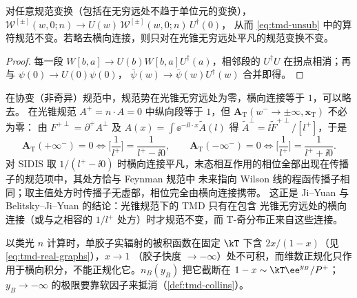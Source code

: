 \begin{proposition}[规范不变性]\tagR
\label{prop:tmd-gauge}
对任意规范变换（包括在无穷远处不趋于单位元的变换），$\mathcal W^{[\pm]}(w,0;n)\to U(w)\,\mathcal W^{[\pm]}(w,0;n)\,U^\dagger(0)$，
从而 \eqref{eq:tmd-unsub} 中的算符规范不变。若略去横向连接，则只对在光锥无穷远处平凡的规范变换不变。
\end{proposition}
\begin{proof}
每一段 $W[b,a]\to U(b)W[b,a]U^\dagger(a)$，相邻段的 $U^\dagger U$ 在拐点相消；再与 $\psi(0)\to U(0)\psi(0)$，
$\bar\psi(w)\to\bar\psi(w)U^\dagger(w)$ 合并即得。
\end{proof}

\begin{remark}
\label{rem:transverse-link}
在协变（非奇异）规范中，规范势在光锥无穷远处为零，横向连接等于 $1$，可以略去\cite{AybatRogers2011}。
在光锥规范 $A^+=n\cdot A=0$ 中纵向段等于 $1$，但 $\boldsymbol A_{\mathrm T}(w^-\to\pm\infty,\boldsymbol x_{\mathrm T})$ 不必为零：
由 $F^{+\perp}=\partial^+A^\perp$ 及 $A(x)=\int\ee^{-\ii l\cdot x}\tilde A(l)$ 得 $\tilde A^\perp=\ii\tilde F^{+\perp}/[l^+]$，于是
\begin{equation}
  \boldsymbol A_{\mathrm T}(+\infty^-)=0\iff\Big[\frac1{l^+}\Big]=\frac1{l^+-\ii0},\qquad
  \boldsymbol A_{\mathrm T}(-\infty^-)=0\iff\Big[\frac1{l^+}\Big]=\frac1{l^++\ii0}.
  \label{eq:lc-prescription}
\end{equation}
对 SIDIS 取 $1/(l^+-\ii0)$ 时横向连接平凡，末态相互作用的相位全部出现在传播子的规范项中，其处方恰与 Feynman 规范中
未来指向 Wilson 线的程函传播子相同；取主值处方时传播子无虚部，相位完全由横向连接携带。
这正是 Ji--Yuan\cite{JiYuan2002} 与 Belitsky--Ji--Yuan\cite{BelitskyJiYuan2003} 的结论：光锥规范下的 TMD 只有在包含
光锥无穷远处的横向连接（或与之相容的 $1/l^+$ 处方）时才规范不变，而 T-奇分布正来自这些连接。
\end{remark}

\begin{remark}[快度发散]
\label{rem:rapidity-divergence}
以类光 $n$ 计算时，单胶子实辐射的被积函数在固定 $\kT$ 下含 $2x/(1-x)$（见 \eqref{eq:tmd-real-graphs}），$x\to1$
（胶子快度 $\to-\infty$）处不可积，而维数正规化只作用于横向积分，不能正规化它。$n_B(y_B)$ 把它截断在
$1-x\sim\kT\ee^{y_B}/P^+$；$y_B\to-\infty$ 的极限要靠软因子来抵消（\cref{def:tmd-collins}）。
\end{remark}

